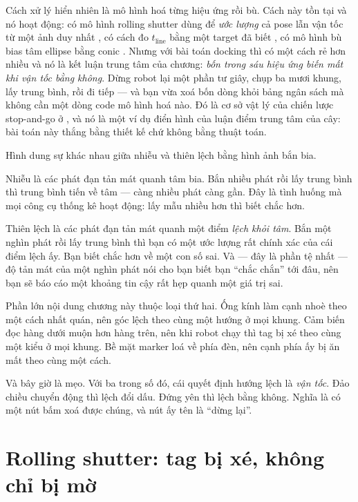 \documentclass[../../marker.tex]{subfiles}
\begin{document}
Cách xử lý hiển nhiên là mô hình hoá từng hiệu ứng rồi bù. Cách này tồn tại và nó hoạt động: có mô hình rolling shutter dùng để \emph{ước lượng} cả pose lẫn vận tốc từ một ảnh duy nhất \cite{ait2006rollingshutter}, có cách đo \(t_{\text{line}}\) bằng một target đã biết \cite{oth2013rollingshutter}, có mô hình bù bias tâm ellipse bằng conic \cite{heikkila2000geometric}. Nhưng với bài toán docking thì có một cách rẻ hơn nhiều và nó là kết luận trung tâm của chương: \emph{bốn trong sáu hiệu ứng biến mất khi vận tốc bằng không}. Dừng robot lại một phần tư giây, chụp ba mươi khung, lấy trung bình, rồi đi tiếp --- và bạn vừa xoá bốn dòng khỏi bảng ngân sách mà không cần một dòng code mô hình hoá nào. Đó là cơ sở vật lý của chiến lược stop-and-go ở , và nó là một ví dụ điển hình của luận điểm trung tâm của cây: bài toán này thắng bằng thiết kế chứ không bằng thuật toán.

\begin{trucgiac}
Hình dung sự khác nhau giữa nhiễu và thiên lệch bằng hình ảnh bắn bia.

Nhiễu là các phát đạn tản mát quanh tâm bia. Bắn nhiều phát rồi lấy trung bình thì trung bình tiến về tâm --- càng nhiều phát càng gần. Đây là tình huống mà mọi công cụ thống kê hoạt động: lấy mẫu nhiều hơn thì biết chắc hơn.

Thiên lệch là các phát đạn tản mát quanh một điểm \emph{lệch khỏi tâm}. Bắn một nghìn phát rồi lấy trung bình thì bạn có một ước lượng rất chính xác của cái điểm lệch ấy. Bạn biết chắc hơn về một con số sai. Và --- đây là phần tệ nhất --- độ tản mát của một nghìn phát nói cho bạn biết bạn ``chắc chắn'' tới đâu, nên bạn sẽ báo cáo một khoảng tin cậy rất hẹp quanh một giá trị sai.

Phần lớn nội dung chương này thuộc loại thứ hai. Ống kính làm cạnh nhoè theo một cách nhất quán, nên góc lệch theo cùng một hướng ở mọi khung. Cảm biến đọc hàng dưới muộn hơn hàng trên, nên khi robot chạy thì tag bị xé theo cùng một kiểu ở mọi khung. Bề mặt marker loá về phía đèn, nên cạnh phía ấy bị ăn mất theo cùng một cách.

Và bây giờ là mẹo. Với ba trong số đó, cái quyết định hướng lệch là \emph{vận tốc}. Đảo chiều chuyển động thì lệch đổi dấu. Đứng yên thì lệch bằng không. Nghĩa là có một nút bấm xoá được chúng, và nút ấy tên là ``dừng lại''.
\end{trucgiac}

\section{Rolling shutter: tag bị xé, không chỉ bị mờ}
\end{document}
